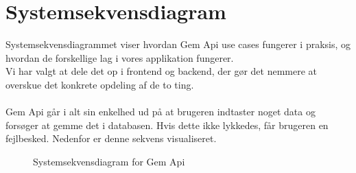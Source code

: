 \hypertarget{Systemsekvensdiagram}{}
\section{Systemsekvensdiagram}
Systemsekvensdiagrammet viser hvordan Gem Api use cases fungerer i praksis, og hvordan de forskellige lag i vores applikation fungerer.
\\
Vi har valgt at dele det op i frontend og backend, der gør det nemmere at overskue det konkrete opdeling af de to ting.
\\\\
Gem Api går i alt sin enkelhed ud på at brugeren indtaster noget data og forsøger at gemme det i databasen.
Hvis dette ikke lykkedes, får brugeren en fejlbesked. Nedenfor er denne sekvens visualiseret.
\begin{figure}[H]
    \caption{Systemsekvensdiagram for Gem Api}
\label{fig:ssd}
\end{figure}
